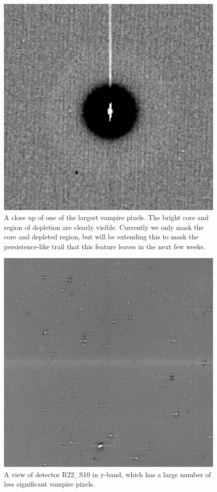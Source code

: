 \begin{figure}
  \includegraphics{figures/isr-f03-vampire_pixel.png}
  \caption{A close up of one of the largest vampire pixels.  The bright core and region of depletion are clearly visible.  Currently we only mask the core and depleted region, but will be extending this to mask the persistence-like trail that this feature leaves in the next few weeks.}
\end{figure}

\begin{figure}
  \includegraphics{figures/isr-f04-vampire_pixels_y_det03.png}
  \caption{A view of detector R22\_S10 in y-band, which has a large number of less significant vampire pixels.}
\end{figure}


